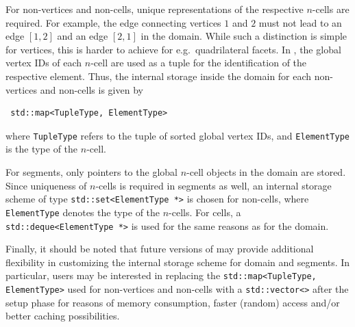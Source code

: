 For non-vertices and non-cells, unique representations of the respective $n$-cells are required. For example, the edge connecting vertices $1$ and $2$ must not lead to an edge $[1,2]$ and an edge $[2,1]$ in the domain.
While such a distinction is simple for vertices, this is harder to achieve for e.g.~quadrilateral facets.
In {\ViennaGrid}, the global vertex IDs of each $n$-cell are used as a tuple for the identification of the respective element.
Thus, the internal storage inside the domain for each non-vertices and non-cells is given by
\begin{lstlisting}
 std::map<TupleType, ElementType>
\end{lstlisting}
where \lstinline|TupleType| refers to the tuple of sorted global vertex IDs, and \lstinline|ElementType| is the type of the $n$-cell.

For segments, only pointers to the global $n$-cell objects in the domain are stored.
Since uniqueness of $n$-cells is required in segments as well, an internal storage scheme of type \lstinline|std::set<ElementType *>| is chosen
for non-cells, where \lstinline|ElementType| denotes the type of the $n$-cells.
For cells, a \lstinline|std::deque<ElementType *>| is used for the same reasons as for the domain.

Finally, it should be noted that future versions of {\ViennaGrid} may provide additional flexibility in customizing the internal storage scheme for domain and segments.
In particular, users may be interested in replacing the \lstinline|std::map<TupleType, ElementType>| used for non-vertices and non-cells with a \lstinline|std::vector<>| after the setup phase for reasons of memory consumption, faster (random) access and/or better caching possibilities.



